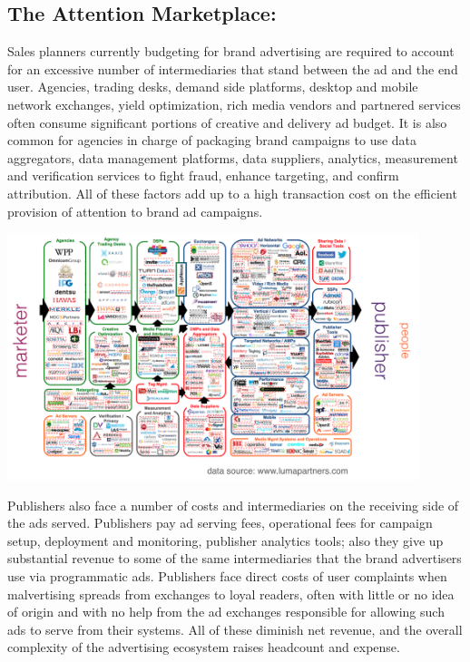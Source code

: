 \documentclass[11pt]{article}
\begin{document}
\subsection{The Attention Marketplace:}
\label{sec-3-2}

Sales planners currently budgeting for brand advertising are required to account for an excessive number of intermediaries that stand between the ad and the end user. Agencies, trading desks, demand side platforms, desktop and mobile network exchanges, yield optimization, rich media vendors and partnered services often consume significant portions of creative and delivery ad budget. It is also common for agencies in charge of packaging brand campaigns to use data aggregators, data management platforms, data suppliers, analytics, measurement and verification services to fight fraud, enhance targeting, and confirm attribution. All of these factors add up to a high transaction cost on the efficient provision of attention to brand ad campaigns.

\begin{center}
\includegraphics[width=0.9\textwidth]{lumascape_recolored.png}
\end{center}

Publishers also face a number of costs and intermediaries on the receiving side of the ads served. Publishers pay ad serving fees, operational fees for campaign setup, deployment and monitoring, publisher analytics tools; also they give up substantial revenue to some of the same intermediaries that the brand advertisers use via programmatic ads. Publishers face direct costs of user complaints when malvertising spreads from exchanges to loyal readers, often with little or no idea of origin and with no help from the ad exchanges responsible for allowing such ads to serve from their systems. All of these diminish net revenue, and the overall complexity of the advertising ecosystem raises headcount and expense.
\end{document}

